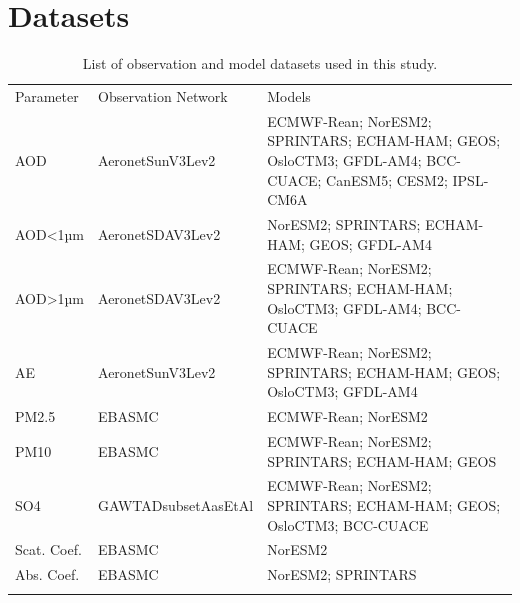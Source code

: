 \documentclass[journal abbreviation, manuscript]{copernicus}
\begin{document}
\section{Datasets}

\begin{table}
 \begin{tabularx}{\textwidth}{llX}
  \tophline
  Parameter   & Observation Network & Models                                                                                                    \\
  \middlehline
  AOD         & AeronetSunV3Lev2    & ECMWF-Rean; NorESM2; SPRINTARS; ECHAM-HAM; GEOS; OsloCTM3; GFDL-AM4; BCC-CUACE; CanESM5; CESM2; IPSL-CM6A \\
  AOD<1µm     & AeronetSDAV3Lev2    & NorESM2; SPRINTARS; ECHAM-HAM; GEOS; GFDL-AM4                                                             \\
  AOD>1µm     & AeronetSDAV3Lev2    & ECMWF-Rean; NorESM2; SPRINTARS; ECHAM-HAM; OsloCTM3; GFDL-AM4; BCC-CUACE                                  \\
  AE          & AeronetSunV3Lev2    & ECMWF-Rean; NorESM2; SPRINTARS; ECHAM-HAM; GEOS; OsloCTM3; GFDL-AM4                                       \\
  PM2.5       & EBASMC              & ECMWF-Rean; NorESM2                                                                                       \\
  PM10        & EBASMC              & ECMWF-Rean; NorESM2; SPRINTARS; ECHAM-HAM; GEOS                                                           \\
  SO4         & GAWTADsubsetAasEtAl & ECMWF-Rean; NorESM2; SPRINTARS; ECHAM-HAM; GEOS; OsloCTM3; BCC-CUACE                                      \\
  Scat. Coef. & EBASMC              & NorESM2                                                                                                   \\
  Abs. Coef.  & EBASMC              & NorESM2; SPRINTARS                                                                                        \\
  \bottomhline
 \end{tabularx}
 \caption{List of observation and model datasets used in this study.}
 \label{datasets}
\end{table}
\end{document}
